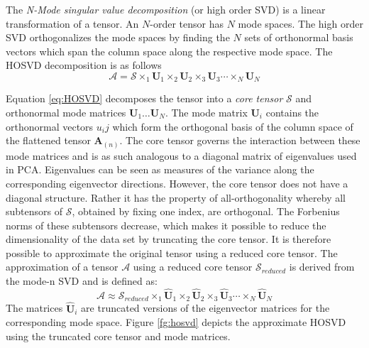 \documentclass[11pt,a4paper,twoside]{report}
\begin{document}
The \textit{N-Mode singular value decomposition} (or high order SVD) is a linear
transformation of a tensor. An $N$-order tensor has $N$ mode spaces. The high
order SVD orthogonalizes the mode spaces by finding the $N$ sets of orthonormal basis vectors
which span the column space along the respective mode space. The HOSVD
decomposition is as follows \cite{multilinear}
\begin{equation}\label{eq:HOSVD}
\mathcal{A} = \mathcal{S} \times_1 \mathbf{U}_1 \times_2
\mathbf{U}_2 \times_3 \mathbf{U}_3 \dotsb \times_N \mathbf{U}_N
\end{equation}

Equation \ref{eq:HOSVD} decomposes the tensor into a \textit{core
  tensor} $\mathcal{S}$ and orthonormal mode matrices $\mathbf{U}_1 \ldots
\mathbf{U}_N$. The mode matrix $\mathbf{U}_i$ contains the orthonormal vectors
$u_ij$ which form the orthogonal basis of the column space of the flattened
tensor $\mathbf{A}_{(n)}$. The core tensor governs the interaction between these
mode matrices and is as such analogous to a diagonal matrix of eigenvalues used
in PCA. Eigenvalues can be seen as measures of the variance along the
corresponding eigenvector directions. However, the core tensor does not have a
diagonal structure. Rather it has the property of all-orthogonality whereby all
subtensors of $\mathcal{S}$, obtained by fixing one index, are orthogonal. The
Forbenius norms of these subtensors decrease, which makes it possible to reduce the dimensionality of
the data set by truncating the core tensor. It is therefore possible to
approximate the original tensor using a reduced core tensor. The approximation
of a tensor
$\mathcal{A}$ using a reduced core tensor $\mathcal{S}_{reduced}$ is derived from the
mode-n SVD and is defined as:
\begin{equation} \label{eq:core_tensor}
\mathcal{A} \approx \mathcal{S}_{reduced} \times_1 \hat{\mathbf{U}}_1 \times_2
\hat{\mathbf{U}}_2 \times_3 \hat{\mathbf{U}}_3 \dotsb \times_N \hat{\mathbf{U}}_N
\end{equation}
The matrices $\hat{\mathbf{U}}_i$ are truncated versions of the eigenvector
matrices for the corresponding mode space. Figure \ref{fg:hosvd} depicts the
approximate HOSVD using the truncated core tensor and mode matrices.
\end{document}
